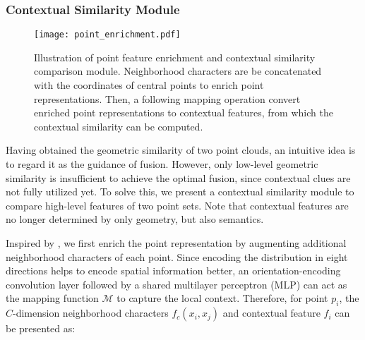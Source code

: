 \documentclass[letterpaper, 10 pt, conference]{ieeeconf}
\begin{document}
\subsubsection{\textbf{Contextual Similarity Module}}

\begin{figure}[t]


    \centering
    \texttt{[image: point\_enrichment.pdf]}
    \vspace{-2mm}
    \caption{Illustration of point feature enrichment and contextual similarity comparison module. Neighborhood characters are be concatenated with the coordinates of central points to enrich point representations. Then, a following mapping operation convert enriched point representations to contextual features, from which the contextual similarity can be computed.} 
    \vspace{-5mm}
\end{figure}

Having obtained the geometric similarity of two point clouds, an intuitive idea is to regard it as the guidance of fusion. However, only low-level geometric similarity is insufficient to achieve the optimal fusion, since contextual clues are not fully utilized yet. 
To solve this, we present a contextual similarity module to compare high-level features of two point sets. Note that contextual features are no longer determined by only geometry, but also semantics.


Inspired by \cite{NIPS2019_8706}, we first enrich the point representation by augmenting additional neighborhood characters of each point.
Since encoding the distribution in eight directions \cite{jiang2018pointsift} helps to encode spatial information better, an orientation-encoding convolution layer followed by a shared multilayer perceptron (MLP) can act as the mapping function $\mathcal{M}$ to capture the local context. Therefore, for point $p_{i}$, the $C$-dimension neighborhood characters $f_{c}(x_{i},x_{j})$ and contextual feature $f_{i}$ can be presented as:
\end{document}
